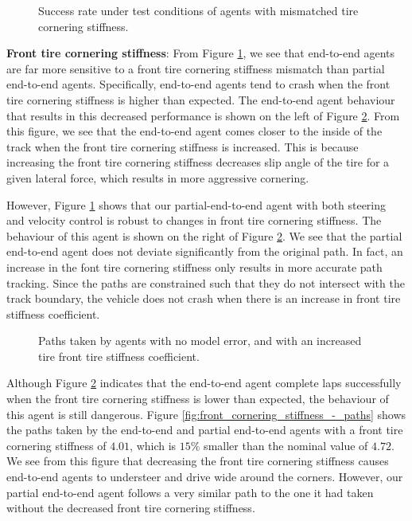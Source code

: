 \begin{figure}[htb!]
    \centering
    
    \caption[Success rate under test conditions of agents with mismatched tire cornering stiffness]{Success rate under test conditions of agents with mismatched tire cornering stiffness.}
    \label{fig:c_s}
\end{figure}

\textbf{Front tire cornering stiffness}: 
From Figure \ref{fig:c_s}, we see that end-to-end agents are far more sensitive to a front tire cornering stiffness mismatch than partial end-to-end agents.
Specifically, end-to-end agents tend to crash when the front tire cornering stiffness is higher than expected.
The end-to-end agent behaviour that results in this decreased performance is shown on the left of Figure \ref{fig:front_cornering_stiffness_+_paths}.
From this figure, we see that the end-to-end agent comes closer to the inside of the track when the front tire cornering stiffness is increased.
This is because increasing the front tire cornering stiffness decreases slip angle of the tire for a given lateral force, which results in more aggressive cornering.

However, Figure \ref{fig:c_s} shows that our partial-end-to-end agent with both steering and velocity control is robust to changes in front tire cornering stiffness.
The behaviour of this agent is shown on the right of Figure \ref{fig:front_cornering_stiffness_+_paths}.
We see that the partial end-to-end agent does not deviate significantly from the original path.
In fact, an increase in the font tire cornering stiffness only results in more accurate path tracking.
Since the paths are constrained such that they do not intersect with the track boundary, the vehicle does not crash when there is an increase in front tire stiffness coefficient.

\begin{figure}[htb!]
    \centering
    
    \caption[Paths taken by agents with no model error, and with an increased tire front tire stiffness coefficient]{Paths taken by agents with no model error, and with an increased tire front tire stiffness coefficient.}
    \label{fig:front_cornering_stiffness_+_paths}
\end{figure}

Although Figure \ref{fig:front_cornering_stiffness_+_paths} indicates that the end-to-end agent complete laps successfully when the front tire cornering stiffness is lower than expected, the behaviour of this agent is still dangerous.
Figure \ref{fig:front_cornering_stiffness_-_paths} shows the paths taken by the end-to-end and partial end-to-end agents with a front tire cornering stiffness of $4.01$, which is $15\%$ smaller than the nominal value of $4.72$.
We see from this figure that decreasing the front tire cornering stiffness causes end-to-end agents to understeer and drive wide around the corners.
However, our partial end-to-end agent follows a very similar path to the one it had taken without the decreased front tire cornering stiffness.

